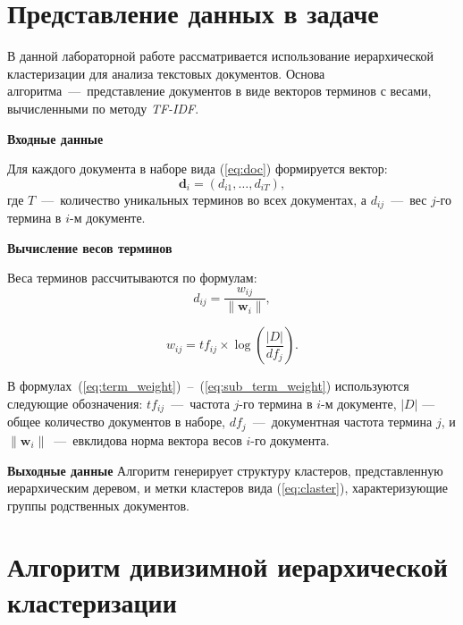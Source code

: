 \section{Представление данных в задаче}

В данной лабораторной работе рассматривается использование иерархической кластеризации для анализа текстовых документов. 
Основа алгоритма~---~представление документов в виде векторов терминов с весами, вычисленными по методу \textit{TF-IDF}.

\textbf{Входные данные}

Для каждого документа в наборе вида (\ref{eq:doc}) формируется вектор:
\begin{equation}\label{eq:term}
	\mathbf{d}_i = (d_{i1}, \ldots, d_{iT}), 
\end{equation}
где \( T \)~---~количество уникальных терминов во всех документах, а \( d_{ij} \)~---~вес  \( j \)-го термина в \( i \)-м документе.

\textbf{Вычисление весов терминов}

Веса терминов рассчитываются по формулам:
\begin{equation}\label{eq:term_weight}
	d_{ij} = \frac{w_{ij}}{\|\mathbf{w}_i\|}, 
\end{equation}

\begin{equation}\label{eq:sub_term_weight}
	w_{ij} = tf_{ij} \times \log\left(\frac{|D|}{df_j}\right).
\end{equation} 

В формулах~(\ref{eq:term_weight})~--~(\ref{eq:sub_term_weight}) используются следующие обозначения: \( tf_{ij} \)~---~частота \( j \)-го термина в \( i \)-м документе, \( |D| \) --- общее количество документов в наборе, \( df_j \)~---~документная частота термина \( j \), и \( \|\mathbf{w}_i\| \)~---~евклидова норма вектора весов \( i \)-го документа.

\textbf{Выходные данные}
Алгоритм генерирует структуру кластеров, представленную иерархическим деревом, и метки кластеров вида (\ref{eq:claster}), характеризующие группы родственных документов.

\section {Алгоритм дивизимной иерархической кластеризации}

